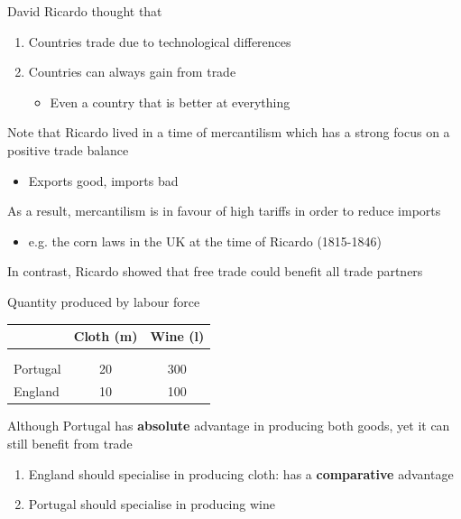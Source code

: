 \documentclass{beamer}
\begin{document}
\begin{frame}
  David Ricardo thought that
  \begin{enumerate}
    \item Countries trade due to technological differences
    \item Countries can always gain from trade
    \begin{itemize}
      \item Even a country that is better at everything
    \end{itemize}
  \end{enumerate}
\end{frame}

\begin{frame}
  Note that Ricardo lived in a time of mercantilism which has a strong focus on a positive trade balance
  \begin{itemize}
    \item Exports good, imports bad
  \end{itemize}
  \medskip
  As a result, mercantilism is in favour of high tariffs in order to reduce imports
  \begin{itemize}
    \item e.g. the corn laws in the UK at the time of Ricardo (1815-1846)
  \end{itemize}
  \medskip
  In contrast, Ricardo showed that free trade could benefit all trade partners
\end{frame}

\begin{frame}
\begin{table}{Quantity produced by labour force}
  \begin{tabular}{lcc}
    ~ & Cloth (m) & Wine (l) \\
    \hline \\[-1.8ex]\\	
    Portugal  & 20  & 300\\
    England & 10  & 100\\    
  \end{tabular}
\end{table}
\end{frame}

\begin{frame}
  Although Portugal has \textbf{absolute} advantage in producing both goods, yet it can still benefit from trade
  \medskip
    \begin{enumerate}
      \item England should specialise in producing cloth: has a \textbf{comparative} advantage
      \item Portugal should specialise in producing wine    
    \end{enumerate}
\end{frame}
\end{document}

